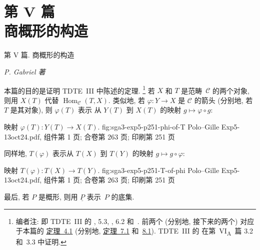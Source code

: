 
\setcounter{footnote}{0}
\chapter*{第 V 篇\\商概形的构造}
\label{exp:sga3-V}
%
  {第 V 篇. 商概形的构造}

\begin{center}
  \textit{P. Gabriel 著}
\end{center}

本篇的目的是证明 TDTE~III 中陈述的定理.%
\footnote{\label{note:sga3-V-1}编者注: 即 TDTE~III 的
, 5.3,
, 6.2 和~.
前两个 (分别地, 接下来的两个) 对应于本篇的
\hyperref[thm:sga3-V-4.1]{定理~4.1}
(分别地, \hyperref[thm:sga3-V-7.1]{定理~7.1} 和~\hyperref[thm:sga3-V-8.1]{8.1}).
TDTE~III 的  在第~VI\textsubscript{A}~篇
3.2 和~3.3 中证明.}
若 \(X\) 和 \(T\) 是范畴~\(\mathscr C\) 的两个对象,
则用 \(X(T)\) 代替 \(\operatorname{Hom}_{\mathscr C}(T,X)\).
类似地, 若 \(\varphi:Y\to X\) 是 \(\mathscr C\) 的箭头
(分别地, 若 \(T\) 是其对象), 则 \(\varphi(T)\) 表示
从 \(Y(T)\) 到 \(X(T)\) 的映射 \(g\mapsto\varphi\circ g\):

  {映射 \(\varphi(T):Y(T)\to X(T)\).}
  {fig:sga3-exp5-p251-phi-of-T}
  {Polo--Gille Exp5-13oct24.pdf, 组件第 1 页; 合卷第 263 页; 印刷第 251 页}

同样地, \(T(\varphi)\) 表示从 \(T(X)\) 到 \(T(Y)\) 的映射
\(g\mapsto g\circ\varphi\):

  {映射 \(T(\varphi):T(X)\to T(Y)\).}
  {fig:sga3-exp5-p251-T-of-phi}
  {Polo--Gille Exp5-13oct24.pdf, 组件第 1 页; 合卷第 263 页; 印刷第 251 页}

最后, 若 \(P\) 是概形, 则用 \(\underline P\) 表示~\(P\) 的底集.

